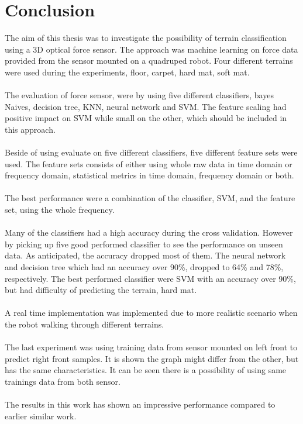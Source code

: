 \documentclass[USenglish]{ifimaster}  %
\begin{document}
\section{Conclusion}
The aim of this thesis was to investigate the possibility of terrain classification using a 3D optical force sensor. The approach was machine learning on force data provided from the sensor mounted on a quadruped robot. Four different terrains were used during the experiments, floor, carpet, hard mat, soft mat. 
\\
\\
The evaluation of force sensor, were by using five different classifiers, bayes Naives, decision tree, KNN, neural network and SVM. The feature scaling had positive impact on SVM while small on the other, which should be included in this approach.
\\
\\
Beside of using evaluate on five different classifiers, five different feature sets were used. The feature sets consists of either using whole raw data in time domain or frequency domain, statistical metrics in time domain, frequency domain or both.
\\
\\
The best performance were a combination of the classifier, SVM, and the feature set, using the whole frequency.  
\\
\\
Many of the classifiers had a high accuracy during the cross validation. However by picking up five good performed classifier to see the performance on unseen data. As anticipated, the accuracy dropped most of them. The neural network and decision tree which had an accuracy over 90\%, dropped to 64\% and 78\%, respectively. The best performed classifier were SVM with an accuracy over 90\%, but had difficulty of predicting the terrain, hard mat.
\\
\\
A real time implementation was implemented due to more realistic scenario when the robot walking through different terrains. 
\\
\\
The last experiment was using training data from sensor mounted on left front to predict right front samples. It is shown the graph might differ from the other, but has the same characteristics. It can be seen there is a possibility of using same trainings data from both sensor. 
\\
\\
The results in this work has shown an impressive performance compared to earlier similar work. 
\end{document}
